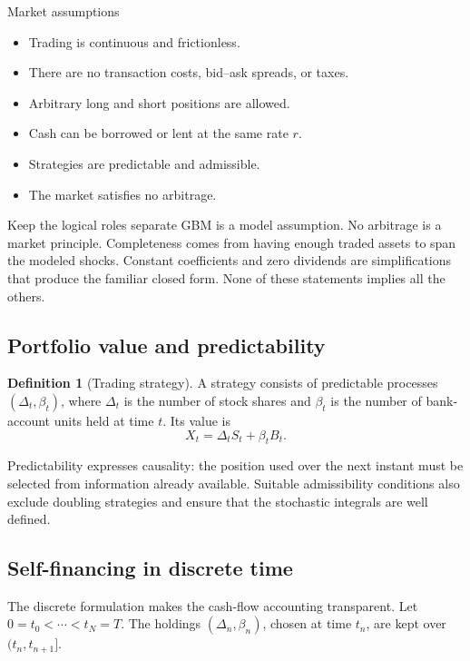 \documentclass[10pt]{article}
\newcommand{\1}{\mathbf 1}
\theoremstyle{definition}
\newtheorem{definition}{Definition}[section]
\begin{document}
\begin{assumptionbox}{Market assumptions}
\begin{itemize}
  \item Trading is continuous and frictionless.
  \item There are no transaction costs, bid--ask spreads, or taxes.
  \item Arbitrary long and short positions are allowed.
  \item Cash can be borrowed or lent at the same rate \(r\).
  \item Strategies are predictable and admissible.
  \item The market satisfies no arbitrage.
\end{itemize}
\end{assumptionbox}

\begin{warningbox}{Keep the logical roles separate}
GBM is a model assumption. No arbitrage is a market principle. Completeness
comes from having enough traded assets to span the modeled shocks. Constant
coefficients and zero dividends are simplifications that produce the familiar
closed form. None of these statements implies all the others.
\end{warningbox}

\subsection{Portfolio value and predictability}

\begin{definition}[Trading strategy]
A strategy consists of predictable processes
\((\Delta_t,\beta_t)\), where \(\Delta_t\) is the number of stock shares and
\(\beta_t\) is the number of bank-account units held at time \(t\). Its value is
\[
\boxed{X_t=\Delta_tS_t+\beta_tB_t.}
\]
\end{definition}

Predictability expresses causality: the position used over the next instant
must be selected from information already available. Suitable admissibility
conditions also exclude doubling strategies and ensure that the stochastic
integrals are well defined.

\subsection{Self-financing in discrete time}

The discrete formulation makes the cash-flow accounting transparent. Let
\(0=t_0<\cdots<t_N=T\). The holdings
\((\Delta_n,\beta_n)\), chosen at time \(t_n\), are kept over
\((t_n,t_{n+1}]\).
\end{document}
